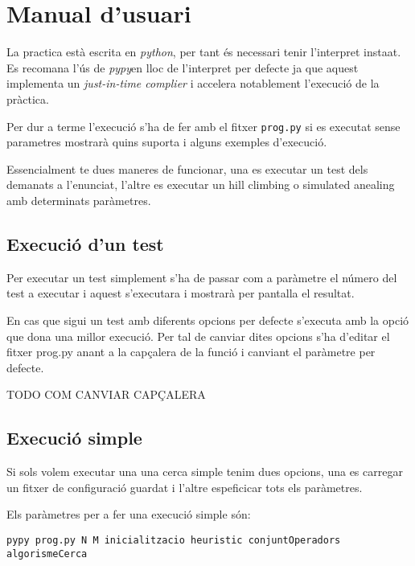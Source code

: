 \section{Manual d'usuari}

La practica està escrita en \emph{python}\footnotemark, per tant és necessari tenir
l'interpret insta\lgem at.
Es recomana l'ús de \emph{pypy}\footnotemark en lloc de l'interpret per defecte ja 
que aquest implementa un \emph{just-in-time complier} i accelera notablement l'execució
de la pràctica.

Per dur a terme l'execució s'ha de fer amb el fitxer \texttt{prog.py} si es executat
sense parametres mostrarà quins suporta i alguns exemples d'execució.

Essencialment te dues maneres de funcionar, una es executar un test dels demanats a l'enunciat,
l'altre es executar un hill climbing o simulated anealing amb determinats paràmetres.

\subsection{Execució d'un test}
Per executar un test simplement s'ha de passar com a paràmetre el número del test a executar i 
aquest s'executara i mostrarà per pantalla el resultat.

En cas que sigui un test amb diferents opcions per defecte s'executa amb la opció que dona
una millor execució. Per tal de canviar dites opcions s'ha d'editar el fitxer prog.py anant
a la capçalera de la funció i canviant el paràmetre per defecte.

TODO COM CANVIAR CAPÇALERA

\subsection{Execució simple}
Si sols volem executar una una cerca simple tenim dues opcions, una es carregar un fitxer de configuració
guardat i l'altre espeficicar tots els paràmetres.

Els paràmetres per a fer una execució simple són:

\begin{verbatim}
pypy prog.py N M inicialitzacio heuristic conjuntOperadors algorismeCerca
\end{verbatim}

